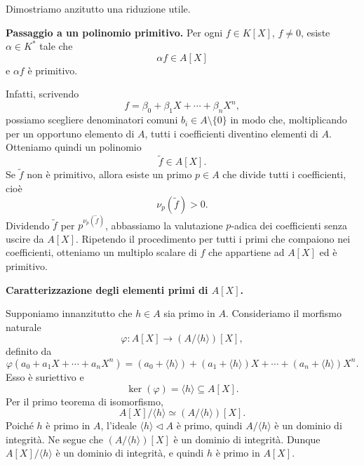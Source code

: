 \documentclass[a4paper]{article}
\begin{document}
\begin{radioactive}
\begin{snippetproof}{}
    Dimostriamo anzitutto una riduzione utile.

    \textbf{Passaggio a un polinomio primitivo.}
    Per ogni \(f\in K[X]\), \(f\neq 0\), esiste \(\alpha\in K^\ast\) tale che
    \[
        \alpha f\in A[X]
    \]
    e \(\alpha f\) è primitivo.

    Infatti, scrivendo
    \[
        f=\beta_0+\beta_1X+\cdots+\beta_nX^n,
    \]
    possiamo scegliere denominatori comuni \(b_i\in A\setminus\{0\}\) in modo che, moltiplicando per un opportuno elemento di \(A\), tutti i coefficienti diventino elementi di \(A\).
    Otteniamo quindi un polinomio
    \[
        \widetilde{f}\in A[X].
    \]
    Se \(\widetilde{f}\) non è primitivo, allora esiste un primo \(p\in A\) che divide tutti i coefficienti, cioè
    \[
        \nu_p(\widetilde{f})>0.
    \]
    Dividendo \(\widetilde{f}\) per \(p^{\nu_p(\widetilde{f})}\), abbassiamo la valutazione \(p\)-adica dei coefficienti senza uscire da \(A[X]\).
    Ripetendo il procedimento per tutti i primi che compaiono nei coefficienti, otteniamo un multiplo scalare di \(f\) che appartiene ad \(A[X]\) ed è primitivo.

    \textbf{Caratterizzazione degli elementi primi di \(A[X]\).}

    Supponiamo innanzitutto che \(h\in A\) sia primo in \(A\).
    Consideriamo il morfismo naturale
    \[
        \varphi\colon A[X]\to (A/\langle h \rangle)[X],
    \]
    definito da
    \[
        \varphi(a_0+a_1X+\cdots+a_nX^n)
        =
        (a_0+\langle h \rangle)+(a_1+\langle h \rangle)X+\cdots+(a_n+\langle h \rangle)X^n.
    \]
    Esso è suriettivo e
    \[
        \ker(\varphi)=\langle h \rangle\subseteq A[X].
    \]
    Per il primo teorema di isomorfismo,
    \[
        A[X]/\langle h \rangle\simeq (A/\langle h \rangle)[X].
    \]
    Poiché \(h\) è primo in \(A\), l'ideale \(\langle h \rangle\triangleleft A\) è primo, quindi \(A/\langle h \rangle\) è un dominio di integrità.
    Ne segue che \((A/\langle h \rangle)[X]\) è un dominio di integrità.
    Dunque \(A[X]/\langle h \rangle\) è un dominio di integrità, e quindi \(h\) è primo in \(A[X]\).


\end{snippetproof}
\end{radioactive}
\end{document}
